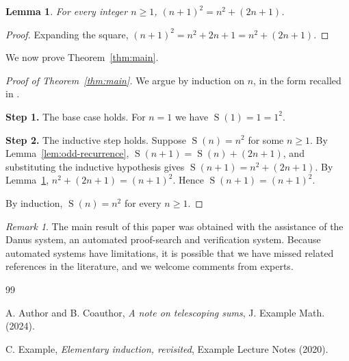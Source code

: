 \documentclass{amsart}
\theoremstyle{plain}
\newtheorem{lem}[thm]{Lemma}
\theoremstyle{definition}
\theoremstyle{remark}
\newtheorem{rem}[thm]{Remark}
\DeclareMathOperator{\Oddsum}{S}
\begin{document}
\begin{lem}\label{lem:square-recurrence}
For every integer $n \ge 1$, $(n+1)^2 = n^2 + (2n+1)$.
\end{lem}

\begin{proof}
Expanding the square, $(n+1)^2 = n^2 + 2n + 1 = n^2 + (2n+1)$.
\end{proof}

We now prove Theorem~\ref{thm:main}.

\begin{proof}[Proof of Theorem~\ref{thm:main}]
We argue by induction on $n$, in the form recalled in \cite[Section~1]{Exm20}.

\noindent\textbf{Step 1.} The base case holds. For $n = 1$ we have $\Oddsum(1) = 1 = 1^2$.

\noindent\textbf{Step 2.} The inductive step holds. Suppose $\Oddsum(n) = n^2$ for some $n \ge 1$. By Lemma~\ref{lem:odd-recurrence}, $\Oddsum(n+1) = \Oddsum(n) + (2n+1)$, and substituting the inductive hypothesis gives $\Oddsum(n+1) = n^2 + (2n+1)$. By Lemma~\ref{lem:square-recurrence}, $n^2 + (2n+1) = (n+1)^2$. Hence $\Oddsum(n+1) = (n+1)^2$.

By induction, $\Oddsum(n) = n^2$ for every $n \ge 1$.
\end{proof}

\begin{rem}
The main result of this paper was obtained with the assistance of the Danus system, an automated proof-search and verification system. Because automated systems have limitations, it is possible that we have missed related references in the literature, and we welcome comments from experts.
\end{rem}

\begin{thebibliography}{99}

A. Author and B. Coauthor,
\emph{A note on telescoping sums},
J. Example Math. (2024).

C. Example,
\emph{Elementary induction, revisited},
Example Lecture Notes (2020).

\end{thebibliography}
\end{document}
